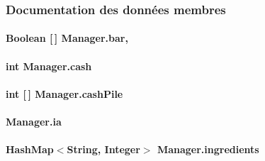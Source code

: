 \subsubsection{Documentation des données membres}
\hypertarget{classManager_a368d64d6025fecd75245c954cfa72e6a}{}
\paragraph[{bar}]{\setlength{\rightskip}{0pt plus 5cm}Boolean \mbox{[}$\,$\mbox{]} Manager.\+bar\hspace{0.3cm}{\ttfamily [static]}, {\ttfamily [private]}}\label{classManager_a368d64d6025fecd75245c954cfa72e6a}
\hypertarget{classManager_a50ed4ee3a6f3c444fab29330ba967ba4}{}
\paragraph[{cash}]{\setlength{\rightskip}{0pt plus 5cm}int Manager.\+cash\hspace{0.3cm}{\ttfamily [private]}}\label{classManager_a50ed4ee3a6f3c444fab29330ba967ba4}
\hypertarget{classManager_a7b0b5ed401cace73cb58b2510efc2508}{}
\paragraph[{cash\+Pile}]{\setlength{\rightskip}{0pt plus 5cm}int \mbox{[}$\,$\mbox{]} Manager.\+cash\+Pile\hspace{0.3cm}{\ttfamily [private]}}\label{classManager_a7b0b5ed401cace73cb58b2510efc2508}
\hypertarget{classManager_a90957746b755371f0051a74b81f2827f}{}
\paragraph[{ia}]{ Manager.\+ia\hspace{0.3cm}{\ttfamily [private]}}\label{classManager_a90957746b755371f0051a74b81f2827f}
\hypertarget{classManager_a731ab4f92babdcabb9a0e2e8ecc91b27}{}
\paragraph[{ingredients}]{\setlength{\rightskip}{0pt plus 5cm}Hash\+Map$<$String, Integer$>$ Manager.\+ingredients\hspace{0.3cm}{\ttfamily [private]}}\label{classManager_a731ab4f92babdcabb9a0e2e8ecc91b27}
\hypertarget{classManager_ab01a8b5bc2e4f1cc3abc9247bbf2ae6b}{}
